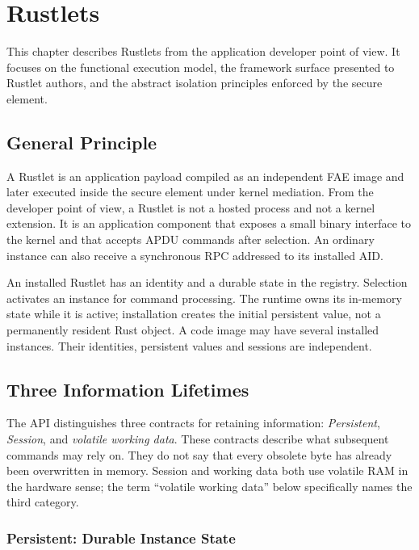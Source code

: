 \chapter{Rustlets}

This chapter describes Rustlets from the application developer point of
view. It focuses on the functional execution model, the framework
surface presented to Rustlet authors, and the abstract isolation
principles enforced by the secure element.

\section{General Principle}

A Rustlet is an application payload compiled as an independent FAE image
and later executed inside the secure element under kernel mediation.
From the developer point of view, a Rustlet is not a hosted process and
not a kernel extension. It is an application component that exposes a
small binary interface to the kernel and that accepts APDU commands after selection. An ordinary
instance can also receive a synchronous RPC addressed to its installed AID.

An installed Rustlet has an identity and a durable state in the registry.
Selection activates an instance for command processing. The runtime owns its
in-memory state while it is active; installation creates the initial
persistent value, not a permanently resident Rust object.
A code image may have several installed instances. Their identities,
persistent values and sessions are independent.

\section{Three Information Lifetimes}
\label{sec:rustlet-state-lifetimes}

The API distinguishes three contracts for retaining information:
\emph{Persistent}, \emph{Session}, and \emph{volatile working data}.
These contracts describe what subsequent commands may rely on. They do not
say that every obsolete byte has already been overwritten in memory.
Session and working data both use volatile RAM in the hardware sense; the
term ``volatile working data'' below specifically names the third category.

\subsection{Persistent: Durable Instance State}

